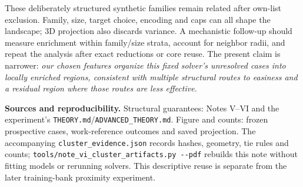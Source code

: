 \documentclass[11pt,english]{article}
\begin{document}
These deliberately structured synthetic families remain related after own-list exclusion. Family, size, target choice, encoding and caps can all shape the landscape; 3D projection also discards variance. A mechanistic follow-up should measure enrichment within family/size strata, account for neighbor radii, and repeat the analysis after exact reductions or core reuse. The present claim is narrower: \emph{our chosen features organize this fixed solver's unresolved cases into locally enriched regions, consistent with multiple structural routes to easiness and a residual region where those routes are less effective.}

\vspace{2pt}
{\footnotesize\raggedright\textbf{Sources and reproducibility.} Structural guarantees: Notes V--VI and the experiment's \texttt{THEORY.md}/\texttt{ADVANCED\_THEORY.md}. Figure and counts: frozen prospective cases, work-reference outcomes and saved projection. The accompanying \texttt{cluster\_evidence.json} records hashes, geometry, tie rules and counts; \texttt{tools/note\_vi\_cluster\_artifacts.py {-}{-}pdf} rebuilds this note without fitting models or rerunning solvers. This descriptive reuse is separate from the later training-bank proximity experiment.\par}
\end{document}

